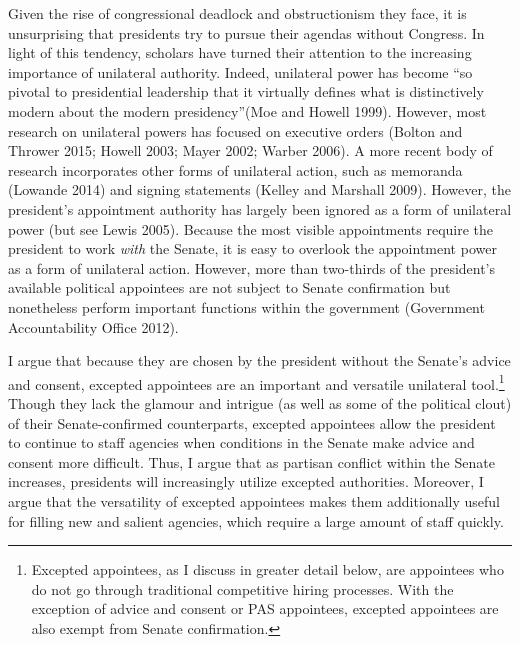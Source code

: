 \documentclass[12pt]{article}
\begin{document}
Given the rise of congressional deadlock and obstructionism they face, it is unsurprising that presidents try to pursue their agendas without Congress. In light of this tendency, scholars have turned their attention to the increasing importance of unilateral authority. Indeed, unilateral power has become ``so pivotal to presidential leadership that it virtually defines what is distinctively modern about the modern presidency''(Moe and Howell 1999). However, most research on unilateral powers has focused on executive orders (Bolton and Thrower 2015; Howell 2003; Mayer 2002; Warber 2006). A more recent body of research incorporates other forms of unilateral action, such as memoranda (Lowande 2014) and signing statements (Kelley and Marshall 2009). However, the president's appointment authority has largely been ignored as a form of unilateral power (but see Lewis 2005). Because the most visible appointments require the president to work \textit{with} the Senate, it is easy to overlook the appointment power as a form of unilateral action. However, more than two-thirds of the president's available political appointees are not subject to Senate confirmation but nonetheless perform important functions within the government (Government Accountability Office 2012).

I argue that because they are chosen by the president without the Senate's advice and consent, excepted appointees are an important and versatile unilateral tool.\footnote{Excepted appointees, as I discuss in greater detail below, are appointees who do not go through traditional competitive hiring processes. With the exception of advice and consent or PAS appointees, excepted appointees are also exempt from Senate confirmation.} Though they lack the glamour and intrigue (as well as some of the political clout) of their Senate-confirmed counterparts, excepted appointees allow the president to continue to staff agencies when conditions in the Senate make advice and consent more difficult. Thus, I argue that as partisan conflict within the Senate increases, presidents will increasingly utilize excepted authorities. Moreover, I argue that the versatility of excepted appointees makes them additionally useful for filling new and salient agencies, which require a large amount of staff quickly.
	
\end{document}
